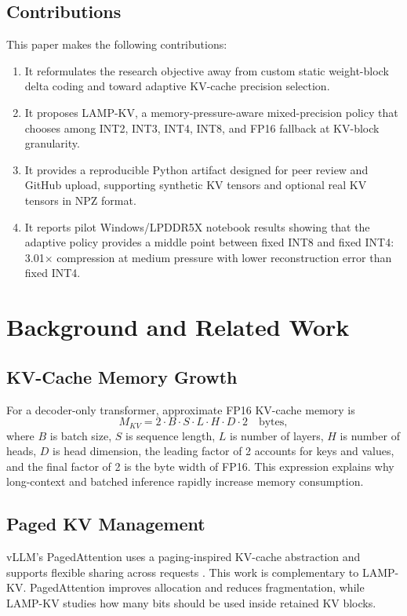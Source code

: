 \documentclass[11pt]{article}
\begin{document}
\subsection{Contributions}
This paper makes the following contributions:
\begin{enumerate}
    \item It reformulates the research objective away from custom static weight-block delta coding and toward adaptive KV-cache precision selection.
    \item It proposes LAMP-KV, a memory-pressure-aware mixed-precision policy that chooses among INT2, INT3, INT4, INT8, and FP16 fallback at KV-block granularity.
    \item It provides a reproducible Python artifact designed for peer review and GitHub upload, supporting synthetic KV tensors and optional real KV tensors in NPZ format.
    \item It reports pilot Windows/LPDDR5X notebook results showing that the adaptive policy provides a middle point between fixed INT8 and fixed INT4: 3.01$\times$ compression at medium pressure with lower reconstruction error than fixed INT4.
\end{enumerate}

\section{Background and Related Work}
\subsection{KV-Cache Memory Growth}
For a decoder-only transformer, approximate FP16 KV-cache memory is
\begin{equation}
    M_{KV} = 2 \cdot B \cdot S \cdot L \cdot H \cdot D \cdot 2 \quad \text{bytes},
\end{equation}
where $B$ is batch size, $S$ is sequence length, $L$ is number of layers, $H$ is number of heads, $D$ is head dimension, the leading factor of 2 accounts for keys and values, and the final factor of 2 is the byte width of FP16. This expression explains why long-context and batched inference rapidly increase memory consumption.

\subsection{Paged KV Management}
vLLM's PagedAttention uses a paging-inspired KV-cache abstraction and supports flexible sharing across requests \cite{kwon2023pagedattention}. This work is complementary to LAMP-KV. PagedAttention improves allocation and reduces fragmentation, while LAMP-KV studies how many bits should be used inside retained KV blocks.
\end{document}
